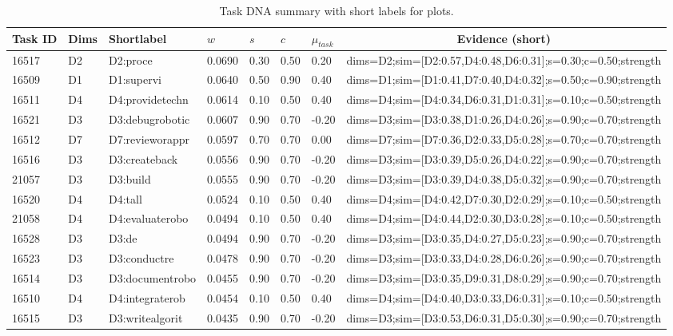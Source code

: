 \begin{table}[htbp]
\centering
\caption{Task DNA summary with short labels for plots.}
\label{tab:appendix_taskdna_shortlabel}
\begin{tabular}{@{}lllllllc@{}}
\toprule
Task ID & Dims & Shortlabel & $w$ & $s$ & $c$ & $\mu_{task}$ & Evidence (short) \\
\midrule
16517 & D2 & D2:proce & 0.0690 & 0.30 & 0.50 & 0.20 & dims=D2;sim=[D2:0.57,D4:0.48,D6:0.31];s=0.30;c=0.50;strength \\
16509 & D1 & D1:supervi & 0.0640 & 0.50 & 0.90 & 0.40 & dims=D1;sim=[D1:0.41,D7:0.40,D4:0.32];s=0.50;c=0.90;strength \\
16511 & D4 & D4:providetechn & 0.0614 & 0.10 & 0.50 & 0.40 & dims=D4;sim=[D4:0.34,D6:0.31,D1:0.31];s=0.10;c=0.50;strength \\
16521 & D3 & D3:debugrobotic & 0.0607 & 0.90 & 0.70 & -0.20 & dims=D3;sim=[D3:0.38,D1:0.26,D4:0.26];s=0.90;c=0.70;strength \\
16512 & D7 & D7:revieworappr & 0.0597 & 0.70 & 0.70 & 0.00 & dims=D7;sim=[D7:0.36,D2:0.33,D5:0.28];s=0.70;c=0.70;strength \\
16516 & D3 & D3:createback & 0.0556 & 0.90 & 0.70 & -0.20 & dims=D3;sim=[D3:0.39,D5:0.26,D4:0.22];s=0.90;c=0.70;strength \\
21057 & D3 & D3:build & 0.0555 & 0.90 & 0.70 & -0.20 & dims=D3;sim=[D3:0.39,D4:0.38,D5:0.32];s=0.90;c=0.70;strength \\
16520 & D4 & D4:tall & 0.0524 & 0.10 & 0.50 & 0.40 & dims=D4;sim=[D4:0.42,D7:0.30,D2:0.29];s=0.10;c=0.50;strength \\
21058 & D4 & D4:evaluaterobo & 0.0494 & 0.10 & 0.50 & 0.40 & dims=D4;sim=[D4:0.44,D2:0.30,D3:0.28];s=0.10;c=0.50;strength \\
16528 & D3 & D3:de & 0.0494 & 0.90 & 0.70 & -0.20 & dims=D3;sim=[D3:0.35,D4:0.27,D5:0.23];s=0.90;c=0.70;strength \\
16523 & D3 & D3:conductre & 0.0478 & 0.90 & 0.70 & -0.20 & dims=D3;sim=[D3:0.33,D4:0.28,D6:0.26];s=0.90;c=0.70;strength \\
16514 & D3 & D3:documentrobo & 0.0455 & 0.90 & 0.70 & -0.20 & dims=D3;sim=[D3:0.35,D9:0.31,D8:0.29];s=0.90;c=0.70;strength \\
16510 & D4 & D4:integraterob & 0.0454 & 0.10 & 0.50 & 0.40 & dims=D4;sim=[D4:0.40,D3:0.33,D6:0.31];s=0.10;c=0.50;strength \\
16515 & D3 & D3:writealgorit & 0.0435 & 0.90 & 0.70 & -0.20 & dims=D3;sim=[D3:0.53,D6:0.31,D5:0.30];s=0.90;c=0.70;strength \\

\end{tabular}
\end{table}
